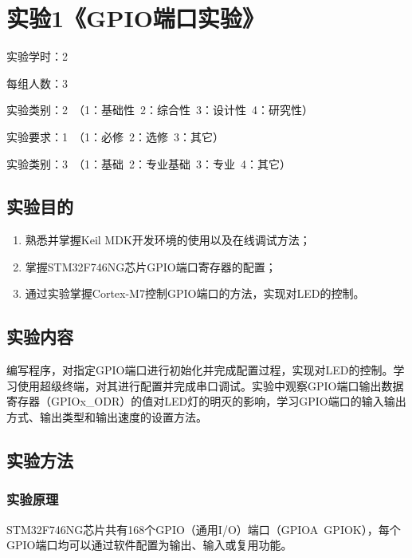 ﻿\documentclass[UTF8,12pt]{article}
\newcommand\myemptypage{
    \null
    \thispagestyle{empty}
    \addtocounter{page}{-1}
    \newpage
}
\begin{document}
\begin{titlepage}
    
\end{titlepage}

\myemptypage

\begin{center}
    \tableofcontents
\end{center}

\newpage

\section{实验1《GPIO端口实验》}

实验学时：2

每组人数：3

实验类别：2\ （1：基础性\ 2：综合性\ 3：设计性\ 4：研究性）

实验要求：1\ （1：必修\ 2：选修\ 3：其它）

实验类别：3\ （1：基础\ 2：专业基础\ 3：专业\ 4：其它）

\subsection{实验目的}
\begin{enumerate}
    \item 熟悉并掌握Keil MDK开发环境的使用以及在线调试方法；
    \item 掌握STM32F746NG芯片GPIO端口寄存器的配置；
    \item 通过实验掌握Cortex-M7控制GPIO端口的方法，实现对LED的控制。
\end{enumerate}

\subsection{实验内容}
编写程序，对指定GPIO端口进行初始化并完成配置过程，实现对LED的控制。学习使用超级终端，对其进行配置并完成串口调试。实验中观察GPIO端口输出数据寄存器（GPIOx\_ODR）的值对LED灯的明灭的影响，学习GPIO端口的输入输出方式、输出类型和输出速度的设置方法。

\subsection{实验方法}

\subsubsection{实验原理}
STM32F746NG芯片共有168个GPIO（通用I/O）端口（GPIOA~GPIOK），每个GPIO端口均可以通过软件配置为输出、输入或复用功能。
\end{document}
